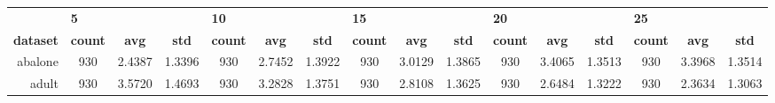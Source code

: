 \begin{table}[htbp]
{\begin{tabular}{rccccccccccccccc}
			\cmidrule{2-3}                      & \multicolumn{1}{l}{\textbf{5}}          &                                                                                    &                 & \multicolumn{1}{l}{\textbf{10}} &                                                                           &                 & \multicolumn{1}{l}{\textbf{15}} &                 &                 & \multicolumn{1}{l}{\textbf{20}} &                                                                           &                 & \multicolumn{1}{l}{\textbf{25}} &                                                                           &                 \\
			\cmidrule{2-16}    \textbf{dataset} & \textbf{count}                          & \textbf{avg}                                                                       & \textbf{std}    & \textbf{count}                  & \textbf{avg}                                                              & \textbf{std}    & \textbf{count}                  & \textbf{avg}    & \textbf{std}    & \textbf{count}                  & \textbf{avg}                                                              & \textbf{std}    & \textbf{count}                  & \textbf{avg}                                                              & \textbf{std}    \\
			\midrule
			abalone                             & 930                                     & \cellcolor[rgb]{ .776,  .937,  .808}\textcolor[rgb]{ 0,  .38,  0}{2.4387}          & 1.3396          & 930                             & 2.7452                                                                    & 1.3922          & 930                             & 3.0129          & 1.3865          & 930                             & 3.4065                                                                    & 1.3513          & 930                             & 3.3968                                                                    & 1.3514          \\
			adult                               & 930                                     & 3.5720                                                                             & 1.4693          & 930                             & 3.2828                                                                    & 1.3751          & 930                             & 2.8108          & 1.3625          & 930                             & 2.6484                                                                    & 1.3222          & 930                             & \cellcolor[rgb]{ .776,  .937,  .808}\textcolor[rgb]{ 0,  .38,  0}{2.3634} & 1.3063          \\

\end{tabular}}
\end{table}
